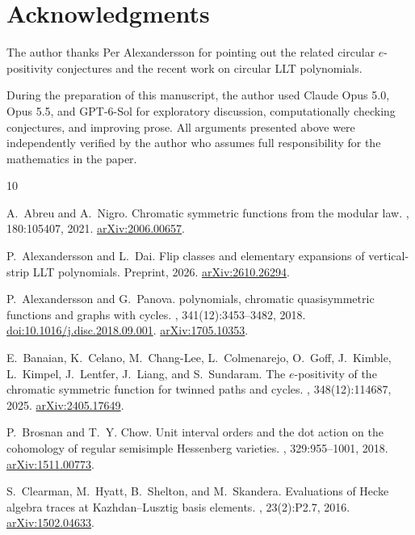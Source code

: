 \documentclass[12pt]{article}
\theoremstyle{plain}
\theoremstyle{definition}
\theoremstyle{remark}
\begin{document}
\section{Acknowledgments}
The author thanks Per Alexandersson for pointing out the related circular $e$-positivity conjectures and the recent work on circular LLT polynomials.

During the preparation of this manuscript, the author used Claude Opus 5.0, Opus 5.5, and GPT-6-Sol for exploratory discussion, computationally checking conjectures, and improving prose. All arguments presented above were independently verified by the author who assumes full responsibility for the mathematics in the paper.
\begin{thebibliography}{10}

A.~Abreu and A.~Nigro.
\newblock Chromatic symmetric functions from the modular law.
, 180:105407, 2021.
\newblock \href{https://arxiv.org/abs/2006.00657}{arXiv:2006.00657}.

P.~Alexandersson and L.~Dai.
\newblock Flip classes and elementary expansions of vertical-strip LLT polynomials.
\newblock Preprint, 2026.
\newblock \href{https://arxiv.org/abs/2610.26294}{arXiv:2610.26294}.

P.~Alexandersson and G.~Panova.
 polynomials, chromatic quasisymmetric functions and graphs with cycles.
, 341(12):3453--3482, 2018.
\newblock \href{https://doi.org/10.1016/j.disc.2018.09.001}{doi:10.1016/j.disc.2018.09.001}.
\newblock \href{https://arxiv.org/abs/1705.10353}{arXiv:1705.10353}.

E.~Banaian, K.~Celano, M.~Chang-Lee, L.~Colmenarejo, O.~Goff, J.~Kimble, L.~Kimpel, J.~Lentfer, J.~Liang, and S.~Sundaram.
\newblock The $e$-positivity of the chromatic symmetric function for twinned paths and cycles.
, 348(12):114687, 2025.
\newblock \href{https://arxiv.org/abs/2405.17649}{arXiv:2405.17649}.

P.~Brosnan and T.~Y. Chow.
\newblock Unit interval orders and the dot action on the cohomology of regular semisimple {H}essenberg varieties.
, 329:955--1001, 2018.
\newblock \href{https://arxiv.org/abs/1511.00773}{arXiv:1511.00773}.

S.~Clearman, M.~Hyatt, B.~Shelton, and M.~Skandera.
\newblock Evaluations of {H}ecke algebra traces at {K}azhdan--{L}usztig basis elements.
, 23(2):P2.7, 2016.
\newblock \href{https://arxiv.org/abs/1502.04633}{arXiv:1502.04633}.


\end{thebibliography}
\end{document}
